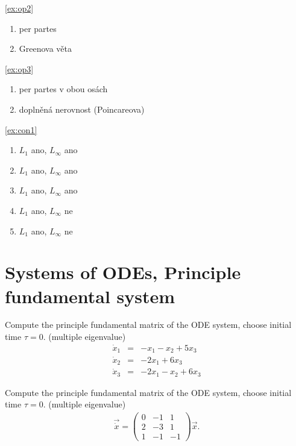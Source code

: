 \documentclass[a4paper,10pt]{book}
\begin{document}
\ref{ex:op2} 
\begin{enumerate}[label=\alph*), itemsep=-5pt, topsep=-7pt]
  \item per partes
  \item Greenova věta
\end{enumerate}

\ref{ex:op3}
\begin{enumerate}[label=\alph*), itemsep=-5pt, topsep=-7pt]
  \item per partes v obou osách
  \item doplněná nerovnost (Poincareova)
\end{enumerate}

\ref{ex:con1}
\begin{enumerate}[label=\alph*), itemsep=-3pt, topsep=-7pt]
  \item $L_1$ ano, $L_\infty$ ano
  \item $L_1$ ano, $L_\infty$ ano
  \item $L_1$ ano, $L_\infty$ ano
  \item $L_1$ ano, $L_\infty$ ne
  \item $L_1$ ano, $L_\infty$ ne
\end{enumerate}


\chapter{Systems of ODEs, Principle fundamental system}

\exercise \label{ex:ode1} Compute the principle fundamental matrix of the ODE system, choose initial time 
$\tau=0$. (multiple eigenvalue)
\begin{eqnarray*}
\dot{x}_1 &=& -x_1  - x_2 + 5x_3 \\
\dot{x}_2 &=& -2x_1       + 6x_3 \\
\dot{x}_3 &=& -2x_1 - x_2 + 6x_3 
\end{eqnarray*}

\exercise \label{ex:ode11} Compute the principle fundamental matrix of the ODE system, choose initial time 
$\tau=0$. (multiple eigenvalue)
\begin{eqnarray*}
\vec{\dot{x}} = \begin{pmatrix} 0 & -1 & 1 \\ 2 & -3 & 1 \\ 1 & -1 & -1 \end{pmatrix} \vec{x}.
\end{eqnarray*}
\end{document}
